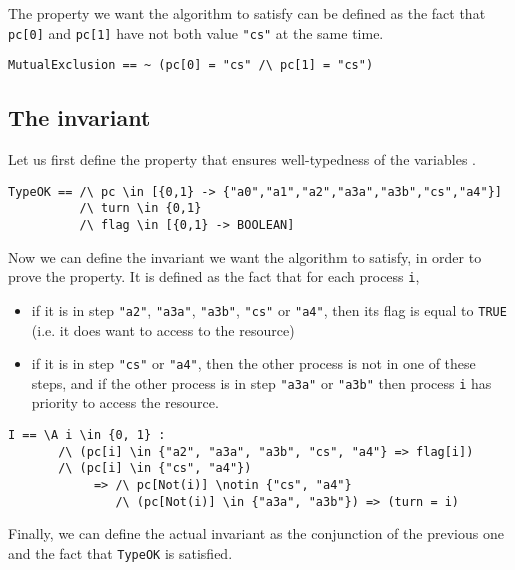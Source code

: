 \documentclass{enonce}
\begin{document}
The property we want the algorithm to satisfy can be defined as the fact that {\tt pc[0]} and {\tt pc[1]} have not both value {\tt "cs"} at the same time.

\begin{verbatim}
MutualExclusion == ~ (pc[0] = "cs" /\ pc[1] = "cs")
\end{verbatim}

\medskip
\subsection{The invariant}
Let us first define the property that ensures well-typedness of the variables .

\begin{verbatim}
TypeOK == /\ pc \in [{0,1} -> {"a0","a1","a2","a3a","a3b","cs","a4"}]
          /\ turn \in {0,1}
          /\ flag \in [{0,1} -> BOOLEAN]
\end{verbatim}

\noindent Now we can define the invariant we want the algorithm to satisfy, in order to prove the  property. It is defined as the fact that for each process {\tt i}, 
\begin{itemize}
\item if it is in step {\tt "a2"}, {\tt "a3a"}, {\tt "a3b"}, {\tt "cs"} or {\tt "a4"}, then its flag is equal to {\tt TRUE} (i.e. it does want to access to the resource)
\item if it is in step {\tt "cs"} or {\tt "a4"}, then the other process is not in one of these steps, and if the other process is in step {\tt "a3a"} or {\tt "a3b"}  then process {\tt i} has priority to access the resource.
\end{itemize}

\smallskip
          
\begin{verbatim}          
I == \A i \in {0, 1} :
       /\ (pc[i] \in {"a2", "a3a", "a3b", "cs", "a4"} => flag[i])
       /\ (pc[i] \in {"cs", "a4"})
            => /\ pc[Not(i)] \notin {"cs", "a4"}
               /\ (pc[Not(i)] \in {"a3a", "a3b"}) => (turn = i)
\end{verbatim}

\noindent Finally, we can define the actual invariant as the conjunction of the previous one and the fact that {\tt TypeOK} is satisfied. 
\end{document}
